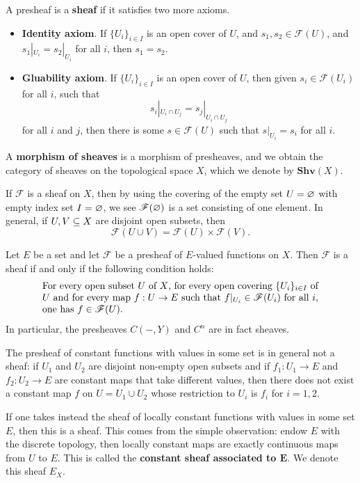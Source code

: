 \begin{definition}
A presheaf is a \textbf{sheaf} if it satisfies two more axioms.
\begin{itemize}
\item \textbf{Identity axiom}. If $\{U_i\}_{i\in I}$ is an open cover of $U$, and $s_1,s_2\in\mathscr{F}(U)$, and $s_1|_{U_i}=s_2|_{U_i}$ for all $i$, then $s_1=s_2$.
\item \textbf{Gluability axiom}. If $\{U_i\}_{i\in I}$ is an open cover of $U$, then given $s_i\in\mathscr{F}(U_i)$ for all $i$, such that 
\[s_i|_{U_i\cap U_j}=s_j|_{U_i\cap U_j}\]
for all $i$ and $j$, then there is some $s\in\mathscr{F}(U)$ such that $s|_{U_i}=s_i$ for all $i$.
\end{itemize}
A \textbf{morphism of sheaves} is a morphism of presheaves, and we obtain the category of sheaves on the topological space $X$, which we denote by $\mathbf{Shv}(X)$.
\end{definition}
\begin{remark}
If $\mathscr{F}$ is a sheaf on $X$, then by using the covering of the empty set $U=\varnothing$ with empty index set $I=\varnothing$, we see $\mathscr{F}(\varnothing)$ is a set consisting of one element. In general, if $U,V\subseteq X$ are disjoint open subsets, then
\[\mathscr{F}(U\cup V)=\mathscr{F}(U)\times\mathscr{F}(V).\]
\end{remark}
\begin{example}\label{sheaf of E-valued function eg}
Let $E$ be a set and let $\mathscr{F}$ be a presheaf of $E$-valued functions on $X$. Then $\mathscr{F}$ is a sheaf if and only if the following condition holds:
\begin{equation*}
\parbox{\dimexpr\linewidth-6em}
{\strut
For every open subset $U$ of $X$, for every open covering $\{U_i\}_{i\in I}$ of $U$ and for every map $f:U\to E$ such that $f|_{U_i}\in\mathscr{F}(U_i)$ for all $i$, one has $f\in\mathscr{F}(U)$.
\strut}
\end{equation*}
In particular, the presheaves $C(-,Y)$ and $C^n$ are in fact sheaves.
\end{example}
\begin{example}
The presheaf of constant functions with values in some set is in general not a sheaf: if $U_1$ and $U_2$ are disjoint non-empty open subsets and if $f_1:U_1\to E$ and $f_2:U_2\to E$ are constant maps that take different values, then there does not exist a constant map $f$ on $U=U_1\cup U_2$ whose restriction to $U_i$ is $f_i$ for $i=1,2$.\par 
If one takes instead the sheaf of locally constant functions with values in some set $E$, then this is a sheaf. This comes from the simple observation: endow $E$ with the discrete topology, then locally constant maps are exactly continuous maps from $U$ to $E$. This is called the \textbf{constant sheaf associated to $\bm{E}$}. We denote this sheaf $E_X$.
\end{example}
